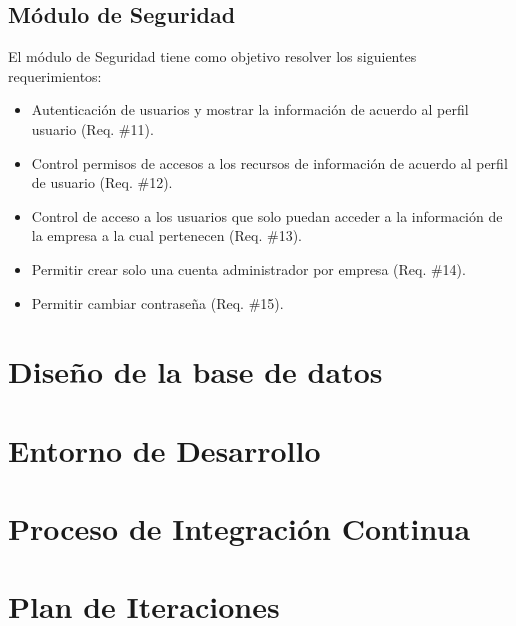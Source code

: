 \subsection{Módulo de Seguridad}
\noindent El módulo de Seguridad tiene como objetivo resolver los siguientes requerimientos:
\begin{itemize}
\item Autenticación de usuarios y mostrar la información de acuerdo al perfil usuario (Req. \#11).
\item Control permisos de accesos a los recursos de información de acuerdo al perfil de usuario (Req. \#12).
\item Control de acceso a los usuarios que solo puedan acceder a la información de la empresa a la cual pertenecen (Req. \#13).
\item Permitir crear solo una cuenta administrador por empresa (Req. \#14).
\item Permitir cambiar contraseña (Req. \#15).
\end{itemize}
\section{Diseño de la base de datos}

\section{Entorno de Desarrollo}

\section{Proceso de Integración Continua}

\section{Plan de Iteraciones}

 
